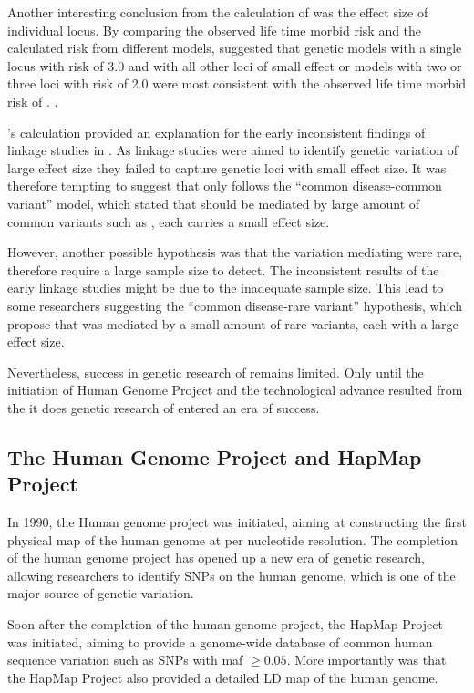 \documentclass[12pt]{book}
\newcommand*{\glng}{\glsentrylong}
\begin{document}
	Another interesting conclusion from the calculation of \citet{Risch1990a} was the effect size of individual locus. 
	By comparing the observed life time morbid risk and the calculated risk from different models, \citeauthor{Risch1990a} 	suggested that genetic models with a single locus with risk of 3.0 and with all other loci of small effect or models with two or three loci with risk of 2.0 were most consistent with the observed life time morbid risk of \glng{scz}.	\citep{Risch1990}.
	
	\citeauthor{Risch1990a}'s calculation provided an explanation for the early inconsistent findings of linkage studies in \glng{scz}\citep{Harrison2005}.
	As linkage studies were aimed to identify genetic variation of large effect size they failed to capture genetic loci with small effect size.
	It was therefore tempting to suggest that \glng{scz} only follows the ``common disease-common variant'' model, which stated that \glng{scz} should be mediated by large amount of common variants such as \glng{SNP}, each carries a small effect size.
	
	However, another possible hypothesis was that the variation mediating \glng{scz} were rare, therefore require a large sample size to detect. 
	The inconsistent results of the early linkage studies might be due to the inadequate sample size. 
	This lead to some researchers suggesting the ``common disease-rare variant'' hypothesis, which propose that \glng{scz} was mediated by a small amount of rare variants, each with a large effect size\citep{McClellan2007}.
	
	Nevertheless, success in genetic research of \glng{scz} remains limited.
	Only until the initiation of Human Genome Project and the technological advance resulted from the it does genetic research of \glng{scz} entered an era of success.

	\subsection{The Human Genome Project and HapMap Project}
	In 1990, the Human genome project was initiated, aiming at constructing the first physical map of the human genome at per nucleotide resolution\citep{Lander2001}.
	The completion of the human genome project has opened up a new era of genetic research, allowing researchers to identify \glspl{SNP} on the human genome, which is one of the major source of genetic variation.
	
	Soon after the completion of the human genome project, the HapMap Project was initiated\citep{Consortium2005}, aiming to provide a genome-wide database of common human sequence variation such as \glspl{SNP} with \gls{maf} $\ge0.05$.
	More importantly was that the HapMap Project also provided a detailed \gls{LD} map of the human genome.
	
\end{document}
